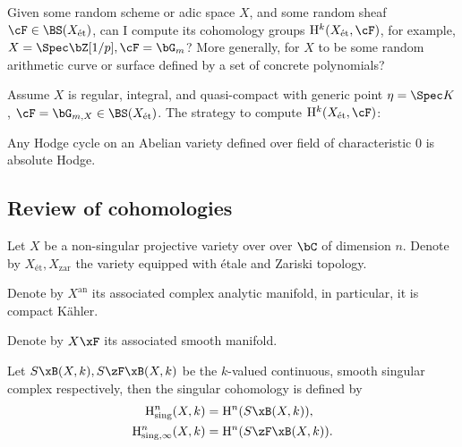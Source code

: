 \documentclass[a4paper, twoside]{article}
\begin{document}





\begin{mtv}
    Given some random scheme or adic space $X$, and some random sheaf $\cF\in\BS(X_{\text{{\'e}t}})$, can I compute its cohomology groups $\mathrm{H}_{}^{k}(X_{\text{{\'e}t}}, \cF)$, for example, $X=\Spec\bZ[1/p], \cF=\bG_{m}$? More generally, for $X$ to be some random arithmetic curve or surface defined by a set of concrete polynomials?
\end{mtv}

\begin{exg}
    Assume $X$ is regular, integral, and quasi-compact with generic point $\eta=\Spec K$, $\cF=\bG_{m,X}\in\BS(X_{\text{{\'e}t}})$. The strategy to compute $\mathrm{H}_{}^{k}(X_{\text{{\'e}t}}, \cF)$:
\end{exg}







\begin{ups}
	Any Hodge cycle on an Abelian variety defined over field of characteristic $0$ is absolute Hodge.
\end{ups}


\subsection{Review of cohomologies}

\begin{stp}
  Let $X$ be a non-singular projective variety over over $\bC$ of dimension $n$. Denote by $X_{\text{\'et}}, X_{\mathrm{zar}}$ the variety equipped with {\'e}tale and Zariski topology.

  Denote by $X^{\mathrm{an}}$ its associated complex analytic manifold, in particular, it is compact K\"ahler.

  Denote by $X\xF$ its associated smooth manifold.

\end{stp}

\begin{dfn}[Singular]
  Let $S\xB(X,k), S\zF\xB(X,k)$ be the $k$-valued continuous, smooth singular complex respectively, then the singular cohomology is defined by
  \begin{align*}
	\mathrm{H}_{\mathrm{sing}}^{n}(X,k)&=\mathrm{H}_{~}^{n}(S\xB(X,k)),\\
	\mathrm{H}_{\mathrm{sing},\infty}^{n}(X,k)&=\mathrm{H}_{~}^{n}(S\zF\xB(X,k)).\\
  \end{align*}
\end{dfn}
\end{document}
